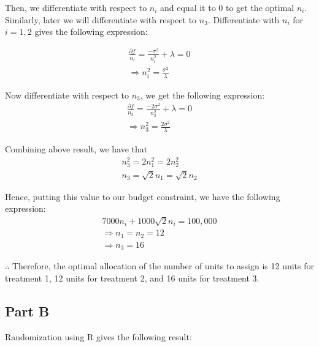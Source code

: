 \documentclass{article}
\begin{document}
\noindent Then, we differentiate with respect to $n_i$ and equal it to 0 to get the optimal $n_i$. Similarly, later we will differentiate with respect to $n_3$. Differentiate with $n_i$ for $i = 1, 2$ gives the following expression:

\begin{eqnarray*}
    \frac{\partial f}{n_i} = \frac{-\sigma^2}{n_i^2} + \lambda = 0 \\
    \Rightarrow n_i^2 = \frac{\sigma^2}{\lambda}
\end{eqnarray*}

\noindent Now differentiate with respect to $n_3$, we get the following expression:
\begin{eqnarray*}
  \frac{\partial f}{n_3} = \frac{-2\sigma^2}{n_3^2} + \lambda = 0 \\
  \Rightarrow n_3^2 = \frac{2\sigma^2}{\lambda}
\end{eqnarray*}

\noindent Combining above result, we have that
\begin{eqnarray*}
  n_3^2 = 2n_1^2 = 2n_2^2 \\
  n_3 = \sqrt 2 n_1 =\sqrt2 n_2
\end{eqnarray*}

\noindent Hence, putting this value to our budget constraint, we have the following expression:
\begin{eqnarray*}
   7000n_i + 1000\sqrt 2 n_i = 100,000 \\
   \Rightarrow n_1 = n_2 = 12 \\
   \Rightarrow n_3 = 16
\end{eqnarray*}

\noindent $\therefore$ Therefore, the optimal allocation of the number of units to assign is 12 units for treatment 1, 12 units for treatment 2, and 16 units for treatment 3.


\subsection{Part B}
Randomization using R gives the following result:
\end{document}
